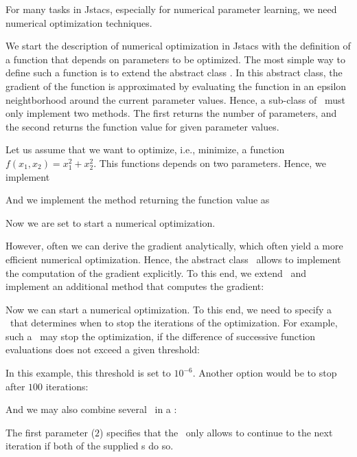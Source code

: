 \setcounter{off}{495}

For many tasks in Jstacs, especially for numerical parameter learning, we need numerical optimization techniques.

We start the description of numerical optimization in Jstacs with the definition of a function that depends on parameters to be optimized. The most simple way to define such a function is to extend the abstract class \NumericalDifferentiableFunction. In this abstract class, the gradient of the function is approximated by evaluating the function in an epsilon neightborhood around the current parameter values. Hence, a sub-class of \NumericalDifferentiableFunction~must only implement two methods. The first returns the number of parameters, and the second returns the function value for given parameter values.

Let us assume that we want to optimize, i.e., minimize, a function $f(x_1,x_2)=x_1^2 + x_2^2$. This functions depends on two parameters. Hence, we implement
\addtocounter{off}{6}
And we implement the method returning the function value as
\addtocounter{off}{5}
Now we are set to start a numerical optimization.

However, often we can derive the gradient analytically, which often yield a more efficient numerical optimization. Hence, the abstract class \DifferentiableFunction~allows to implement the computation of the gradient explicitly. To this end, we extend \DifferentiableFunction~and implement an additional method that computes the gradient:
\addtocounter{off}{19}

Now we can start a numerical optimization. To this end, we need to specify a \TerminationCondition~that determines when to stop the iterations of the optimization. For example, such a \TerminationCondition~may stop the optimization, if the difference of successive function evaluations does not exceed a given threshold:
\addtocounter{off}{7}
In this example, this threshold is set to $10^{-6}$. Another option would be to stop after $100$ iterations:
\addtocounter{off}{1}

And we may also combine several \TerminationCondition~in a \CombinedCondition:
\addtocounter{off}{3}
The first parameter ($2$) specifies that the \CombinedCondition~only allows to continue to the next iteration if both of the supplied \TerminationCondition s do so. 

